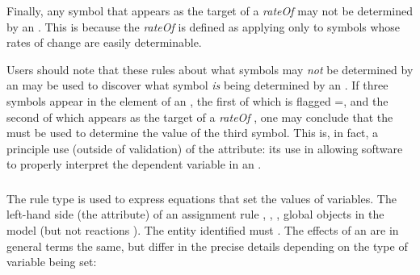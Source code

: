 \begin{blockChanged}
Finally, any symbol that appears as the target of a \emph{rateOf}  may not be determined by an \AlgebraicRule.  This is because the \emph{rateOf}  is defined as applying only to symbols whose rates of change are easily determinable.
\end{blockChanged}

\begin{blockChanged}
Users should note that these rules about what symbols may \emph{not} be determined by an \AlgebraicRule may be used to discover what symbol \emph{is} being determined by an \AlgebraicRule.  If three symbols appear in the  element of an \AlgebraicRule, the first of which is flagged =, and the second of which appears as the target of a \emph{rateOf} , one may conclude that the \AlgebraicRule must be used to determine the value of the third symbol.  This is, in fact, a principle use (outside of validation) of the  attribute: its use in allowing software to properly interpret the dependent variable in an \AlgebraicRule.
\end{blockChanged}


\subsubsection{}
\label{sec:assignmentrule}

The rule type \AssignmentRule is used to express equations that
set the values of variables.  The left-hand side (the 
 attribute) of an assignment rule 
\Species, \SpeciesReference, \Compartment, 
 global \Parameter objects in
the model (but not reactions ).  The entity identified must
.  The effects of
an \AssignmentRule are in general terms the same, but differ in
the precise details depending on the type of variable being set:

